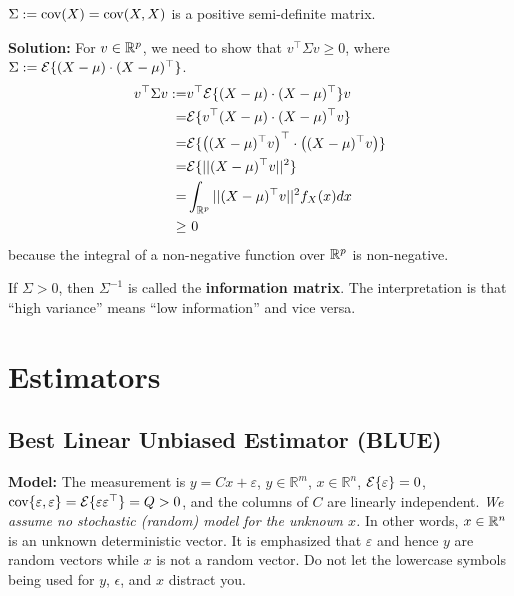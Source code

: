 \begin{exercise}
  $\Sigma:={\rm cov}(X)={\rm cov}(X,X)$ is a positive semi-definite matrix.
\end{exercise}

\textbf{Solution:} For $ v \in \mathbb R^p$, we need to show that $v^\top \Sigma v\ge 0$, where $\Sigma := \mathcal{E} \{(X-\mu) \cdot (X-\mu)^\top \}$. 
\begin{align*}
    v^\top \Sigma v:=& v^\top \mathcal{E} \{(X-\mu) \cdot (X-\mu)^\top \} v \\ 
    =&  \mathcal{E} \{v^\top(X-\mu) \cdot (X-\mu)^\top v\}  \\
    =& \mathcal{E} \{ \left((X-\mu)^\top v\right)^\top \cdot \left((X-\mu)^\top v \right)\} \\
    =& \mathcal{E}\{|| (X-\mu)^\top v ||^2  \} \\
    =& \int_{\mathbb R^p} || (X-\mu)^\top v ||^2 f_X(x) dx \\
    \ge& ~ 0
\end{align*}
because the integral of a non-negative function over $\mathbb R^p$ is non-negative.
\Qed

\begin{definition} If $\Sigma >0$, then $\Sigma^{-1}$ is called the \textbf{information matrix}. The interpretation is that ``high variance'' means ``low information'' and vice versa.
\end{definition}

  
        
\section{Estimators}

\subsection{Best Linear Unbiased Estimator (BLUE)}

\textbf{Model:} The measurement is $y=Cx+\varepsilon$, $y\in \mathbb{R}^m$, $x \in \mathbb{R}^n$, $\mathcal{E}\{\varepsilon\}=0$, $\mathrm{cov}\{\varepsilon,\varepsilon\}=\mathcal{E}\{\varepsilon \varepsilon^\top \}=Q>0$, and
the columns of $C$ are linearly independent. \emph{We assume no stochastic (random) model for the unknown $x$.} In other words, $x\in \mathbb R^n$ is an unknown deterministic vector. It is emphasized that $\varepsilon$ and hence $y$ are random vectors while $x$ is not a random vector. Do not let the lowercase symbols being used for $y$, $\epsilon$, and $x$ distract you.\\


